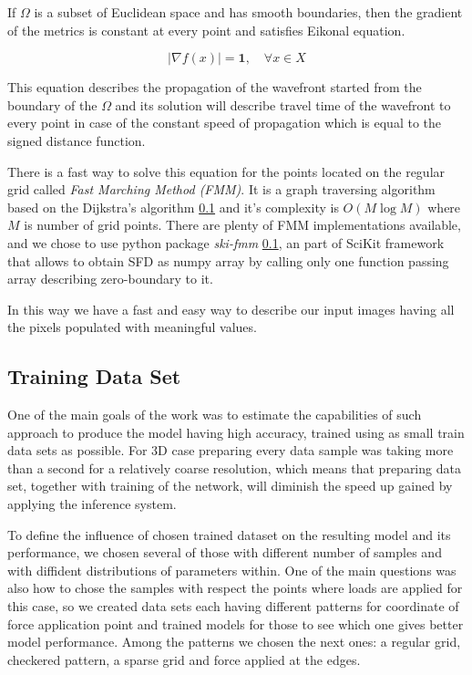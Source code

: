 If $\Omega$ is a subset of Euclidean space and has smooth boundaries, then the gradient of the metrics is constant at every point and satisfies Eikonal equation.

\[
 |\nabla f(x)| = \mathbf{1}, \quad \forall x \in X
\]

This equation describes the propagation of the wavefront started from the boundary of the $\Omega$ and its solution will describe travel time of the wavefront to every point in case of the constant speed of propagation which is equal to the signed distance function.
\medskip

There is a fast way to solve this equation for the points located on the regular grid called \textit{Fast Marching Method (FMM)}.
It is a graph traversing algorithm based on the Dijkstra's algorithm \ref{} and it's complexity is $O(M \log M)$ where $M$ is number of grid points.
There are plenty of FMM implementations available, and we chose to use python package \textit{ski-fmm} \ref{}, an part of SciKit framework that allows to obtain SFD as numpy array by calling only one function passing array describing zero-boundary to it.
\medskip

In this way we have a fast and easy way to describe our input images having all the pixels populated with meaningful values.

\subsection{Training Data Set}

One of the main goals of the work was to estimate the capabilities of such approach to produce the model having high accuracy, trained using as small train data sets as possible.
For 3D case preparing every data sample was taking more than a second for a relatively coarse resolution, which means that preparing data set, together with training of the network, will diminish the speed up gained by applying the inference system.  

To define the influence of chosen trained dataset on the resulting model and its performance, we chosen several of those with different number of samples and with diffident distributions of parameters within. 
One of the main questions was also how to chose the samples with respect the points where loads are applied for this case, so we created data sets each having different patterns for coordinate of force application point and trained models for those to see which one gives better model performance.
Among the patterns we chosen the next ones: a regular grid, checkered pattern, a sparse grid and force applied at the edges.

